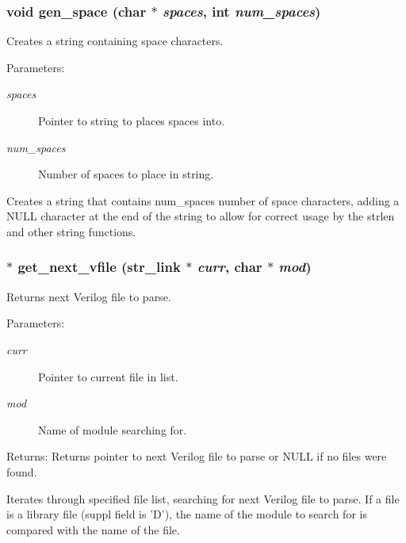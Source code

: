 \subsubsection{\setlength{\rightskip}{0pt plus 5cm}void gen\_\-space (char $\ast$ {\em spaces}, int {\em num\_\-spaces})}\label{util_8h_a16}


Creates a string containing space characters. 

\begin{Desc}
\item[Parameters:]
\begin{description}
\item[{\em spaces}]Pointer to string to places spaces into. \item[{\em num\_\-spaces}]Number of spaces to place in string.\end{description}
\end{Desc}
Creates a string that contains num\_\-spaces number of space characters, adding a NULL character at the end of the string to allow for correct usage by the strlen and other string functions. 
\subsubsection{$\ast$ get\_\-next\_\-vfile ({\bf str\_\-link} $\ast$ {\em curr}, char $\ast$ {\em mod})}\label{util_8h_a13}


Returns next Verilog file to parse. 

\begin{Desc}
\item[Parameters:]
\begin{description}
\item[{\em curr}]Pointer to current file in list. \item[{\em mod}]Name of module searching for.\end{description}
\end{Desc}
\begin{Desc}
\item[Returns:]Returns pointer to next Verilog file to parse or NULL if no files were found.\end{Desc}
Iterates through specified file list, searching for next Verilog file to parse. If a file is a library file (suppl field is 'D'), the name of the module to search for is compared with the name of the file. 
